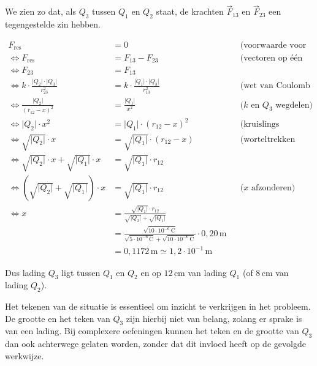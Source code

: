 \documentclass{ximera}
\begin{document}
\begin{example}[foldable=true,title={Voorbeeld: drie ladingen op één lijn of lading in evenwicht}]
\begin{solution}
        We zien zo dat, als $Q_{3}$ tussen $Q_{1}$ en $Q_{2}$ staat, de krachten $\vec{F}_{13}$ en $\vec{F}_{23}$ een tegengestelde zin hebben.
        
        \begin{align*}
            F_{\text{res}} &= 0 && \text{(voorwaarde voor rust)} \\
            \Leftrightarrow F_{\text{res}} &= F_{13} - F_{23} && \text{(vectoren op één lijn optellen)} \\
            \Leftrightarrow F_{23} &= F_{13} \\
            \Leftrightarrow k \cdot \frac{\lvert Q_{2}\rvert \cdot \lvert Q_{3}\rvert}{r_{23}^{2}} &= k \cdot \frac{\lvert Q_{1}\rvert \cdot \lvert Q_{3}\rvert}{r_{13}^{2}} && \text{(wet van Coulomb invullen)} \\
            \Leftrightarrow \frac{\lvert Q_{2}\rvert}{(r_{12}-x)^{2}} &= \frac{\lvert Q_{1}\rvert}{x^{2}} && \text{($k$ en $Q_3$ wegdelen)} \\
            \Leftrightarrow \lvert Q_{2}\rvert \cdot x^{2} &= \lvert Q_{1}\rvert \cdot (r_{12}-x)^{2} && \text{(kruislings vermenigvuldigen)} \\
            \Leftrightarrow \sqrt{\lvert Q_{2}\rvert} \cdot x &= \sqrt{\lvert Q_{1}\rvert} \cdot (r_{12}-x) && \text{(worteltrekken beiderzijds)} \\
            \Leftrightarrow \sqrt{\lvert Q_{2}\rvert} \cdot x + \sqrt{\lvert Q_{1}\rvert} \cdot x &= \sqrt{\lvert Q_{1}\rvert} \cdot r_{12} \\
            \Leftrightarrow (\sqrt{\lvert Q_{2}\rvert} + \sqrt{\lvert Q_{1}\rvert}) \cdot x &= \sqrt{\lvert Q_{1}\rvert} \cdot r_{12} && \text{($x$ afzonderen)} \\
            \Leftrightarrow x &= \frac{\sqrt{\lvert Q_{1}\rvert} \cdot r_{12}}{\sqrt{\lvert Q_{2}\rvert} + \sqrt{\lvert Q_{1}\rvert}} \\
            &= \frac{\sqrt{10 \cdot 10^{-6} \, \mathrm{C}}}{\sqrt{5 \cdot 10^{-6} \, \mathrm{C}} + \sqrt{10 \cdot 10^{-6} \, \mathrm{C}}} \cdot 0{,}20 \, \mathrm{m} \\
            &= 0{,}1172 \, \mathrm{m} \simeq \boxed{1{,}2 \cdot 10^{-1} \, \mathrm{m}}
        \end{align*}
        
        Dus lading $Q_{3}$ ligt tussen $Q_{1}$ en $Q_{2}$ en op $12 \, \mathrm{cm}$ van lading $Q_{1}$ (of $8 \, \mathrm{cm}$ van lading $Q_{2}$).
        
        \begin{hint}
            Het tekenen van de situatie is essentieel om inzicht te verkrijgen in het probleem. De grootte en het teken van $Q_{3}$ zijn hierbij niet van belang, zolang er sprake is van een lading. Bij complexere oefeningen kunnen het teken en de grootte van $Q_{3}$ dan ook achterwege gelaten worden, zonder dat dit invloed heeft op de gevolgde werkwijze.
        \end{hint}
    \end{solution}
\end{example}
\end{document}
